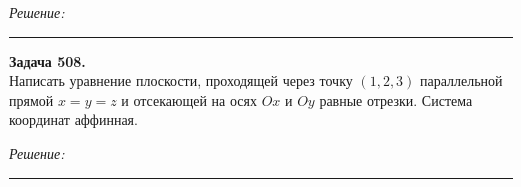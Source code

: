 \documentclass[a4paper, 12pt]{article}
\newenvironment{problem}[2][Задача]
    { \begin{mdframed}[backgroundcolor=gray!10] \textbf{#1 #2.} \\}
    {  \end{mdframed}}
\newenvironment{solution}
    {\textit{Решение: }}
    {\noindent\rule{7in}{1.5pt}}
\begin{document}
\begin{solution}
%
%
%
%

\end{solution}

\begin{problem}{508}
Написать уравнение плоскости, проходящей через точку $(1,2,3)$
параллельной прямой $x=y=z$ и отсекающей на осях $Ox$ и $Oy$ равные отрезки.
Система координат аффинная.
\end{problem}
\begin{solution}



\end{solution}
\end{document}
